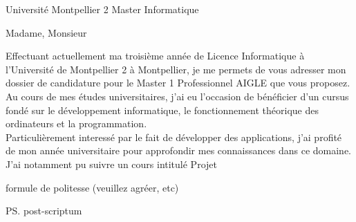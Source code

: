 \documentclass[11pt]{letter}
\date{\today}
\begin{document}
\begin{letter}{Université Montpellier 2 Master Informatique}
\def\concname{\textbf{Objet :~}}
\opening{Madame, Monsieur}
Effectuant actuellement ma troisième année de Licence Informatique à l'Université de Montpellier 2 à Montpellier, je me permets de vous adresser mon dossier de candidature pour le Master 1 Professionnel AIGLE que vous proposez.\\
Au cours de mes études universitaires, j'ai eu l'occasion de bénéficier d'un cursus fondé sur le développement informatique, le fonctionnement théorique des ordinateurs et la programmation.\\
Particulièrement interessé par le fait de développer des applications, j'ai profité de mon année universitaire pour approfondir mes connaissances dans ce domaine. J'ai notamment pu suivre un cours intitulé Projet
\closing{formule de politesse (veuillez agréer, etc)}
\ps{post-scriptum}
\end{letter}
\end{document}

